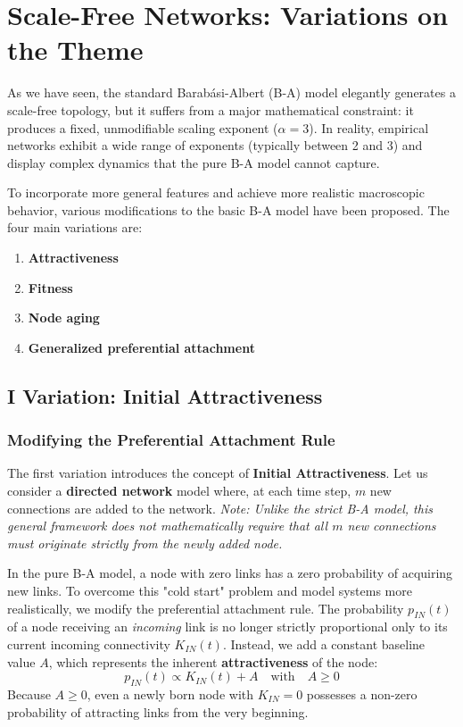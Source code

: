 \section{Scale-Free Networks: Variations on the Theme}

As we have seen, the standard Barabási-Albert (B-A) model elegantly generates a scale-free topology, but it suffers from a major mathematical constraint: it produces a fixed, unmodifiable scaling exponent (\( \alpha = 3 \)). In reality, empirical networks exhibit a wide range of exponents (typically between 2 and 3) and display complex dynamics that the pure B-A model cannot capture.

To incorporate more general features and achieve more realistic macroscopic behavior, various modifications to the basic B-A model have been proposed. The four main variations are:
\begin{enumerate}
    \item \textbf{Attractiveness}
    \item \textbf{Fitness}
    \item \textbf{Node aging}
    \item \textbf{Generalized preferential attachment}
\end{enumerate}

\subsection{I Variation: Initial Attractiveness}

\subsubsection{Modifying the Preferential Attachment Rule}

The first variation introduces the concept of \textbf{Initial Attractiveness}. Let us consider a \textbf{directed network} model where, at each time step, \( m \) new connections are added to the network.
\textit{Note: Unlike the strict B-A model, this general framework does not mathematically require that all \( m \) new connections must originate strictly from the newly added node.}

In the pure B-A model, a node with zero links has a zero probability of acquiring new links. To overcome this "cold start" problem and model systems more realistically, we modify the preferential attachment rule. The probability \( p_{IN}(t) \) of a node receiving an \textit{incoming} link is no longer strictly proportional only to its current incoming connectivity \( K_{IN}(t) \). Instead, we add a constant baseline value \( A \), which represents the inherent \textbf{attractiveness} of the node:
\[
    p_{IN}(t) \propto K_{IN}(t) + A \quad \text{with} \quad A \geq 0
\]
Because \( A \geq 0 \), even a newly born node with \( K_{IN} = 0 \) possesses a non-zero probability of attracting links from the very beginning.

